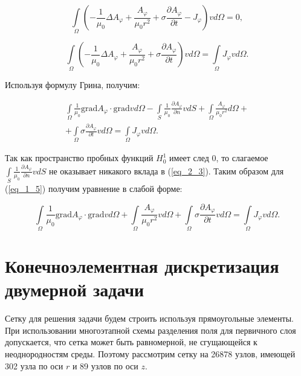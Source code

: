 \begin{equation} \label{eq_2_1}
	\int \limits_{\Omega} \left( -\frac{1}{\mu_0} \Delta A_{\varphi} + \frac{A_{\varphi}}{\mu_0 r^2} + \sigma \frac{\partial A_{\varphi}}{\partial t} - J_{\varphi}\right) v d\Omega = 0,
\end{equation}

\begin{equation} \label{eq_2_2}
	\int \limits_{\Omega} \left( -\frac{1}{\mu_0} \Delta A_{\varphi} + \frac{A_{\varphi}}{\mu_0 r^2} + \sigma \frac{\partial A_{\varphi}}{\partial t} \right) v d\Omega = \int \limits_{\Omega} J_{\varphi} v d\Omega.
\end{equation}

Используя формулу Грина, получим:

\begin{equation} \label{eq_2_3}
\begin{gathered}
	\int \limits_{\Omega}  \frac{1}{\mu_0} \text{grad} A_{\varphi} \cdot \text{grad} v d\Omega - \int \limits_{S} \frac{1}{\mu_0} \frac{\partial A_{\varphi}}{\partial n} v dS + \int \limits_{\Omega} \frac{A_{\varphi}}{\mu_0 r^2} d \Omega + \\ + \int \limits_{\Omega} \sigma \frac{\partial A_{\varphi}}{\partial t}  v d\Omega = \int \limits_{\Omega} J_{\varphi} v d\Omega.
\end{gathered}
\end{equation}

Так как пространство пробных функций $H_0^1$ имеет след 0, то слагаемое $\int \limits_{S} \frac{1}{\mu_0} \frac{\partial A_{\varphi}}{\partial n} v dS$ не оказывает никакого вклада в (\ref{eq_2_3}). Таким образом для (\ref{eq_1_5}) получим уравнение в слабой форме:

\begin{equation} \label{eq_2_4}
	\int \limits_{\Omega}  \frac{1}{\mu_0} \text{grad} A_{\varphi} \cdot \text{grad} v d\Omega + \int \limits_{\Omega} \frac{A_{\varphi}}{\mu_0 r^2} v d \Omega + \int \limits_{\Omega} \sigma \frac{\partial A_{\varphi}}{\partial t}  v d\Omega = \int \limits_{\Omega} J_{\varphi} v d\Omega.
\end{equation}

\section{Конечноэлементная дискретизация двумерной задачи}

Сетку для решения задачи будем строить используя прямоугольные элементы. При использовании многоэтапной схемы разделения поля для первичного слоя допускается, что сетка может быть равномерной, не сгущающейся к неоднородностям среды. Поэтому рассмотрим сетку на 26878 узлов, имеющей 302 узла по оси $r$ и 89 узлов по оси $z$.

